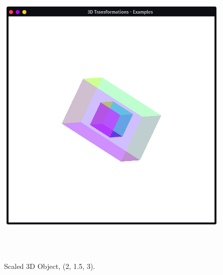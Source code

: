 \documentclass[12pt, a4]{article}
\begin{document}
\subsection*{}
\begin{figure}[h]
\centering
\caption{Scaled 3D Object, (2, 1.5, 3).}
\includegraphics[height=15cm, width=15cm]{Outputs/Output-3.png}
\end{figure}

\newpage
\end{document}
